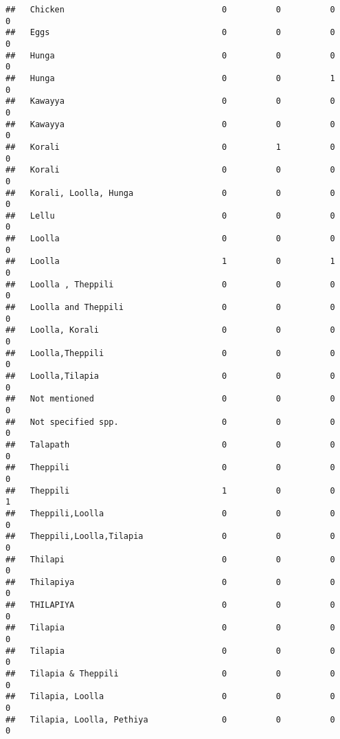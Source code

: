 \documentclass[
]{article}
\begin{document}
\begin{verbatim}
##   Chicken                                0          0          0       0
##   Eggs                                   0          0          0       0
##   Hunga                                  0          0          0       0
##   Hunga                                  0          0          1       0
##   Kawayya                                0          0          0       0
##   Kawayya                                0          0          0       0
##   Korali                                 0          1          0       0
##   Korali                                 0          0          0       0
##   Korali, Loolla, Hunga                  0          0          0       0
##   Lellu                                  0          0          0       0
##   Loolla                                 0          0          0       0
##   Loolla                                 1          0          1       0
##   Loolla , Theppili                      0          0          0       0
##   Loolla and Theppili                    0          0          0       0
##   Loolla, Korali                         0          0          0       0
##   Loolla,Theppili                        0          0          0       0
##   Loolla,Tilapia                         0          0          0       0
##   Not mentioned                          0          0          0       0
##   Not specified spp.                     0          0          0       0
##   Talapath                               0          0          0       0
##   Theppili                               0          0          0       0
##   Theppili                               1          0          0       1
##   Theppili,Loolla                        0          0          0       0
##   Theppili,Loolla,Tilapia                0          0          0       0
##   Thilapi                                0          0          0       0
##   Thilapiya                              0          0          0       0
##   THILAPIYA                              0          0          0       0
##   Tilapia                                0          0          0       0
##   Tilapia                                0          0          0       0
##   Tilapia & Theppili                     0          0          0       0
##   Tilapia, Loolla                        0          0          0       0
##   Tilapia, Loolla, Pethiya               0          0          0       0
\end{verbatim}
\end{document}
